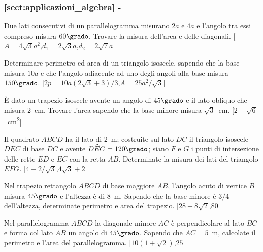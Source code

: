 \begingroup
\hypersetup{linkcolor=black}
\subsubsection*{\ref{sect:applicazioni_algebra} - 
}
\endgroup

\begin{multicols}{2}


\begin{esercizio}
\label{ese:7.16}
Due lati consecutivi di un parallelogramma misurano $2a$ e $4a$ e 
l'angolo tra essi compreso misura $60\grado$. Trovare la misura 
dell'area e delle diagonali.
\hfill[$A=4\sqrt{3}a^2$,\quad $d_1=2\sqrt{3}a$,\quad $d_2=2\sqrt{7}a$]
\end{esercizio}

\begin{esercizio}
\label{ese:7.18}
Determinare perimetro ed area di un triangolo isoscele, sapendo che 
la base misura $10a$ e che l'angolo adiacente ad uno degli angoli 
alla base misura $150\grado$.
\hfill[$2p=10a(2\sqrt{3}+3)/3$,\quad $A=25a^2/\sqrt{3}$]
\end{esercizio}


\begin{esercizio}
\label{ese:7.21}
\`E dato un trapezio isoscele avente un angolo di $45\grado$ e il 
lato obliquo che misura 2~cm. Trovare l'area sapendo che la base 
minore misura $\sqrt{3}$~cm.
\hfill[$2+\sqrt{6}$~cm\textsuperscript{2}]
\end{esercizio}

\begin{esercizio}
\label{ese:7.23}
Il quadrato $ABCD$ ha il lato di 2~m; costruite sul lato $DC$ il 
triangolo isoscele $DEC$ di base $DC$ e avente 
$D\widehat{E}C=120\grado$; siano $F$ e $G$ i punti di intersezione 
delle rette $ED$ e $EC$ con la retta $AB$. Determinate la misura dei 
lati del triangolo $EFG$.
\hfill[$4+2/\sqrt{3}$,\quad $4\sqrt{3}+2$]
\end{esercizio}


\begin{esercizio}
\label{ese:7.26}
Nel trapezio rettangolo $ABCD$ di base maggiore $AB$, l'angolo acuto 
di vertice $B$ misura $45\grado$ e l'altezza è di 8~m. Sapendo che la 
base minore è $3/4$ dell'altezza, determinate perimetro e area del 
trapezio.
\hfill[$28+8\sqrt{2}$,\quad $80$]
\end{esercizio}

\begin{esercizio}
\label{ese:7.27}
Nel parallelogramma $ABCD$ la diagonale minore $AC$ è perpendicolare 
al lato $BC$ e forma col lato $AB$ un angolo di $45\grado$. Sapendo 
che $AC=5$~m, calcolate il perimetro e l'area del parallelogramma.
\hfill[$10(1+\sqrt{2})$,\quad $25$]
\end{esercizio}


\end{multicols}
